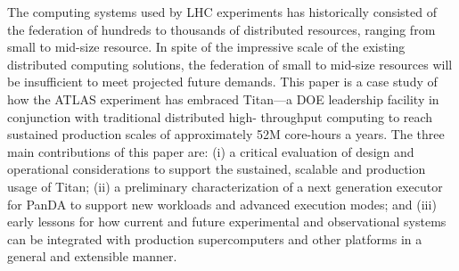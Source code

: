 The computing systems used by LHC experiments has historically consisted of
the federation of hundreds to thousands of distributed resources, ranging
from small to mid-size resource.  In spite of the impressive scale of the
existing distributed computing solutions, the federation of small to mid-size
resources will be insufficient to meet projected future demands. This paper
is a case study of how the ATLAS experiment has embraced Titan---a DOE
leadership facility in conjunction with traditional distributed high-
throughput computing to reach sustained production scales of approximately
52M core-hours a years. The three main contributions of this paper are:  (i)
a critical evaluation of design and operational considerations  to support
the sustained, scalable and production usage of Titan;  (ii) a preliminary
characterization of a next generation executor for PanDA to support new
workloads and  advanced execution modes; and (iii) early lessons for how
current and future experimental and observational systems can be integrated
with production supercomputers and other platforms in a general and
extensible manner.